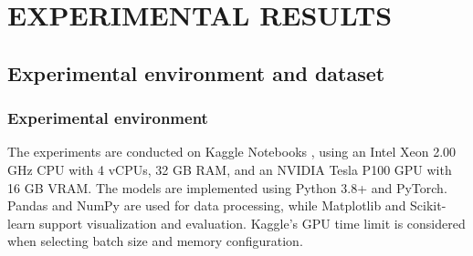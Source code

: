 \documentclass[10pt,twoside]{article}
\begin{document}
\section{EXPERIMENTAL RESULTS}

\subsection{Experimental environment and dataset}

\subsubsection{Experimental environment}
The experiments are conducted on Kaggle Notebooks \cite{noauthor_notebooks_nodate}, using an Intel Xeon 2.00 GHz CPU with 4 vCPUs, 32 GB RAM, and an NVIDIA Tesla P100 GPU with 16 GB VRAM. The models are implemented using Python 3.8+ and PyTorch. Pandas and NumPy are used for data processing, while Matplotlib and Scikit-learn support visualization and evaluation. Kaggle's GPU time limit is considered when selecting batch size and memory configuration.
\end{document}
